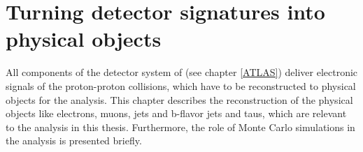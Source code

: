 \chapter{Turning detector signatures into physical objects}\label{detectorsignatures}
All components of the detector system of {\ATLAS} (see chapter \ref{ATLAS}) deliver electronic signals of the proton-proton collisions, which have to be reconstructed to physical objects for the analysis. This chapter describes the reconstruction of the physical objects like electrons, muons, jets and b-flavor jets and taus, which are relevant to the analysis in this thesis. Furthermore, the role of Monte Carlo simulations in the analysis is presented briefly.
